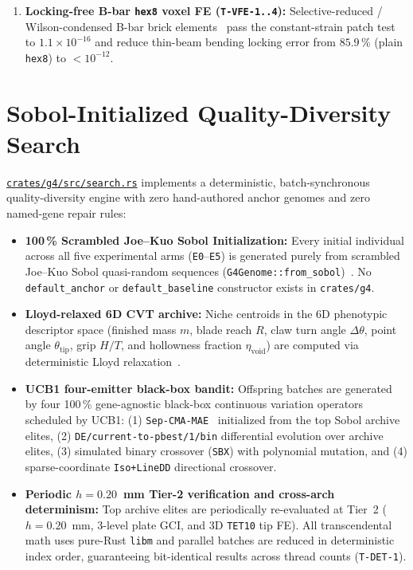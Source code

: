 \documentclass[10pt,journal,letterpaper]{IEEEtran}
\DeclareRobustCommand{\code}[1]{\texorpdfstring{{\nolinkurl{#1}}}{#1}}
\newcommand{\src}[2]{\href{https://github.com/neverhuman/jarambit/blob/v\GFourVersion/#1}{#2}}
\begin{document}
\begin{enumerate}
with Peterson notch sensitivity $K_f$~\cite{peterson1974} and local thickness knockdown $k_t(t_{\mathrm{local}})$, while Goodman
fatigue at $R=0$ is computed from true root bending stress $\sigma_{\max} = 180\,\sigma_{1\mathrm{N}}$ against the 300~MPa endurance
limit with $k_t(t)$ applied once.
\item \textbf{Locking-free B-bar \code{hex8} voxel FE (\code{T-VFE-1..4}):} Selective-reduced / Wilson-condensed B-bar brick
elements~\cite{simo1990} pass the constant-strain patch test to $1.1\times 10^{-16}$ and reduce thin-beam bending locking error from
$85.9\,\%$ (plain \code{hex8}) to $< 10^{-12}$.
\end{enumerate}

\section{Sobol-Initialized Quality-Diversity Search}\label{sec:search}
\src{crates/g4/src/search.rs}{\code{crates/g4/src/search.rs}} implements a deterministic, batch-synchronous quality-diversity engine
with zero hand-authored anchor genomes and zero named-gene repair rules:
\begin{itemize}
\item \textbf{100\,\% Scrambled Joe--Kuo Sobol Initialization:} Every initial individual across all five experimental arms
(\code{E0}--\code{E5}) is generated purely from scrambled Joe--Kuo Sobol quasi-random sequences (\code{G4Genome::from\_sobol})~\cite{joe2008}.
No \code{default\_anchor} or \code{default\_baseline} constructor exists in \code{crates/g4}.
\item \textbf{Lloyd-relaxed 6D CVT archive:} Niche centroids in the 6D phenotypic descriptor space (finished mass $m$, blade reach
$R$, claw turn angle $\Delta\theta$, point angle $\theta_{\mathrm{tip}}$, grip $H/T$, and hollowness fraction $\eta_{\mathrm{void}}$)
are computed via deterministic Lloyd relaxation~\cite{vassiliades2018}.
\item \textbf{UCB1 four-emitter black-box bandit:} Offspring batches are generated by four 100\,\% gene-agnostic black-box continuous
variation operators scheduled by UCB1:
(1) \code{Sep-CMA-MAE}~\cite{fontaine2023} initialized from the top Sobol archive elites,
(2) \code{DE/current-to-pbest/1/bin} differential evolution over archive elites,
(3) simulated binary crossover (\code{SBX}) with polynomial mutation, and
(4) sparse-coordinate \code{Iso+LineDD} directional crossover.
\item \textbf{Periodic $h = 0.20$~mm Tier-2 verification and cross-arch determinism:} Top archive elites are periodically re-evaluated
at Tier~2 ($h = 0.20$~mm, 3-level plate GCI, and 3D \code{TET10} tip FE). All transcendental math uses pure-Rust \code{libm} and
parallel batches are reduced in deterministic index order, guaranteeing bit-identical results across thread counts (\code{T-DET-1}).
\end{itemize}
\end{document}
